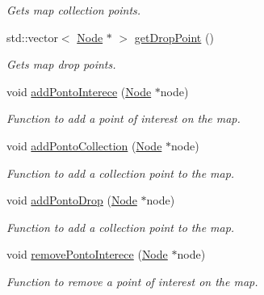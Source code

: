 \begin{DoxyCompactItemize}
\begin{DoxyCompactList}\small\item\em Gets map collection points. \end{DoxyCompactList}\item 
std\+::vector$<$ \mbox{\hyperlink{class_node}{Node}} $\ast$ $>$ \mbox{\hyperlink{class_map_a28915a48f8ddc0b8573197241f496337}{get\+Drop\+Point}} ()
\begin{DoxyCompactList}\small\item\em Gets map drop points. \end{DoxyCompactList}\item 
\mbox{\label{class_map_a6af4bf45d807e5da15f501061ec5c442}} 
void \mbox{\hyperlink{class_map_a6af4bf45d807e5da15f501061ec5c442}{add\+Ponto\+Interece}} (\mbox{\hyperlink{class_node}{Node}} $\ast$node)
\begin{DoxyCompactList}\small\item\em Function to add a point of interest on the map. \end{DoxyCompactList}\item 
\mbox{\label{class_map_aa2509f1d5eaee4e379654b1ae9faf6bb}} 
void \mbox{\hyperlink{class_map_aa2509f1d5eaee4e379654b1ae9faf6bb}{add\+Ponto\+Collection}} (\mbox{\hyperlink{class_node}{Node}} $\ast$node)
\begin{DoxyCompactList}\small\item\em Function to add a collection point to the map. \end{DoxyCompactList}\item 
\mbox{\label{class_map_a979210490d5717d8167e62ad0542eb6f}} 
void \mbox{\hyperlink{class_map_a979210490d5717d8167e62ad0542eb6f}{add\+Ponto\+Drop}} (\mbox{\hyperlink{class_node}{Node}} $\ast$node)
\begin{DoxyCompactList}\small\item\em Function to add a collection point to the map. \end{DoxyCompactList}\item 
\mbox{\label{class_map_aa384385be3a2c0e637d186d79c37ff9b}} 
void \mbox{\hyperlink{class_map_aa384385be3a2c0e637d186d79c37ff9b}{remove\+Ponto\+Interece}} (\mbox{\hyperlink{class_node}{Node}} $\ast$node)
\begin{DoxyCompactList}\small\item\em Function to remove a point of interest on the map. \end{DoxyCompactList}\item 

\end{DoxyCompactItemize}
